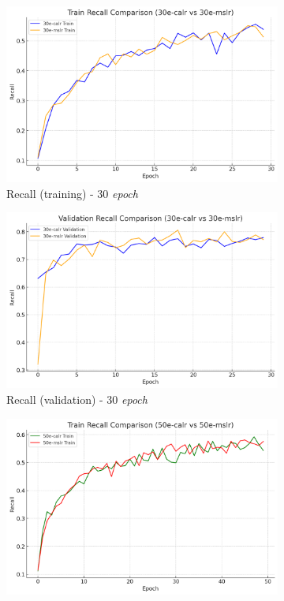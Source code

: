\begin{figure}[htbp]
  \centering
  \begin{subfigure}{0.45\textwidth}
    \includegraphics[width=\textwidth]{gambar/bab4-train-recall-30e.png}
    \caption{Recall (training) - 30 \emph{epoch}}
  \end{subfigure}
  \hfill
  \begin{subfigure}{0.45\textwidth}
    \includegraphics[width=\textwidth]{gambar/bab4-val-recall-30e.png}
    \caption{Recall (validation) - 30 \emph{epoch}}
  \end{subfigure}
  \hfill
  \begin{subfigure}{0.45\textwidth}
    \includegraphics[width=\textwidth]{gambar/bab4-train-recall-50e.png}

\end{subfigure}
\end{figure}
